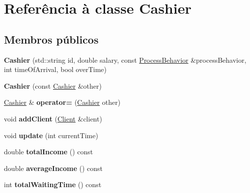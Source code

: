 \hypertarget{classCashier}{\section{Referência à classe Cashier}
\label{de/d14/classCashier}
}
\subsection*{Membros públicos}
\begin{DoxyCompactItemize}
\item 
\hypertarget{classCashier_ae0b9b991bed233e91d802ed24a1689a0}{{\bfseries Cashier} (std\-::string id, double salary, const \hyperlink{classProcessBehavior}{Process\-Behavior} \&process\-Behavior, int time\-Of\-Arrival, bool over\-Time)}\label{de/d14/classCashier_ae0b9b991bed233e91d802ed24a1689a0}

\item 
\hypertarget{classCashier_aa3438cc7699379f97fb86204cee96f3b}{{\bfseries Cashier} (const \hyperlink{classCashier}{Cashier} \&other)}\label{de/d14/classCashier_aa3438cc7699379f97fb86204cee96f3b}

\item 
\hypertarget{classCashier_ae50bc394e4ac4ee80817aff2b8ecd846}{\hyperlink{classCashier}{Cashier} \& {\bfseries operator=} (\hyperlink{classCashier}{Cashier} other)}\label{de/d14/classCashier_ae50bc394e4ac4ee80817aff2b8ecd846}

\item 
\hypertarget{classCashier_a8a0e504ffb0178331eac83900182de06}{void {\bfseries add\-Client} (\hyperlink{classClient}{Client} \&client)}\label{de/d14/classCashier_a8a0e504ffb0178331eac83900182de06}

\item 
\hypertarget{classCashier_ae84eef690ba7beb9c38e1813bf4a4934}{void {\bfseries update} (int current\-Time)}\label{de/d14/classCashier_ae84eef690ba7beb9c38e1813bf4a4934}

\item 
\hypertarget{classCashier_a21fec12d0be5f4ae5f530ff0ee0d6c6e}{double {\bfseries total\-Income} () const }\label{de/d14/classCashier_a21fec12d0be5f4ae5f530ff0ee0d6c6e}

\item 
\hypertarget{classCashier_aef70a7f98c9049e74830abdc3ef16e48}{double {\bfseries average\-Income} () const }\label{de/d14/classCashier_aef70a7f98c9049e74830abdc3ef16e48}

\item 
\hypertarget{classCashier_af627f5b03558df68531aa86e4eced5a2}{int {\bfseries total\-Waiting\-Time} () const }\label{de/d14/classCashier_af627f5b03558df68531aa86e4eced5a2}


\end{DoxyCompactItemize}
